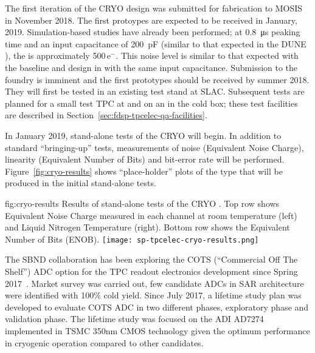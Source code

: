 The first iteration of the CRYO  design was submitted for fabrication to MOSIS in November 2018.  The first protoypes are expected to be received in January, 2019. Simulation-based studies have already been performed; at \SI{0.8}{\micro\second} peaking time and an input capacitance of \SI{200}{pF} (similar to that expected in the DUNE ), the  is approximately \num{500}\,e$^-$.  This noise level is similar to that expected with the baseline  and   design in \lar with the same input capacitance.  Submission to the  foundry is imminent and the first prototypes should be received by summer 2018. They will first be tested in an existing test stand at SLAC. Subsequent tests are planned for a small test TPC at \fnal and on an  in the  cold box; these test facilities are described in Section~\ref{sec:fdsp-tpcelec-qa-facilities}.

In January 2019, stand-alone tests of the CRYO  will begin. In addition to standard ``bringing-up'' tests, measurements of noise (Equivalent Noise Charge), linearity (Equivalent Number of Bits) and bit-error rate will be performed. Figure~\ref{fig:cryo-results} shows ``place-holder'' plots of the type that will be produced in the initial stand-alone tests.

\begin{dunefigure}
{fig:cryo-results}
{Results of stand-alone tests of the CRYO . Top row shows Equivalent Noise Charge measured in each channel at room temperature (left) and Liquid Nitrogen Temperature (right). Bottom row shows the Equivalent Number of Bits (ENOB). }
\texttt{[image: sp-tpcelec-cryo-results.png]}
\end{dunefigure}

\label{sec:fdsp-tpcelec-design-femb-alt-cots}

The SBND collaboration has been exploring the COTS (``Commercial Off The Shelf'') ADC option for the TPC readout electronics development since Spring 2017~\cite{Chen:2018zic}. Market survey was carried out, few candidate ADCs in SAR architecture were identified with 100\% cold yield. Since July 2017, a lifetime study plan was developed to evaluate COTS ADC in two different phases, exploratory phase and validation phase. The lifetime study was focused on the ADI AD7274 implemented in TSMC 350nm CMOS technology given the optimum performance in cryogenic operation compared to other candidates.


